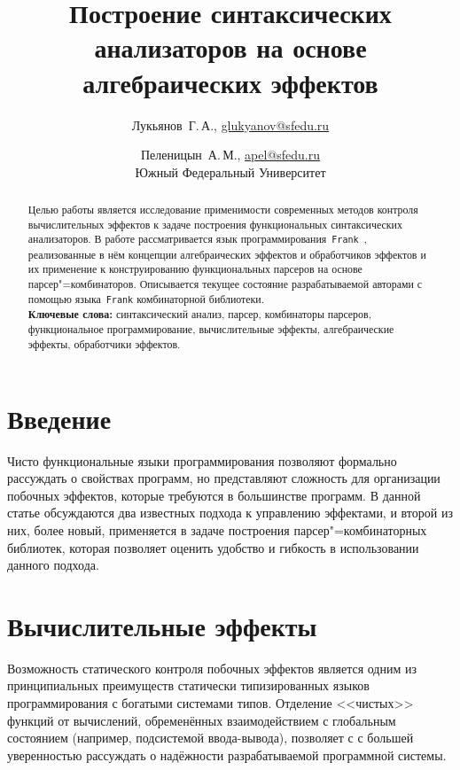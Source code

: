 \documentclass [a4paper] {article}
\title %
  {Построение синтаксических анализаторов
   на основе алгебраических эффектов}
\author %
{%
  Лукьянов~Г.\,А., \url {glukyanov@sfedu.ru} \and %
  Пеленицын~А.\,М., \url {apel@sfedu.ru} \\
  Южный Федеральный Университет
}%
\date {}    %
\begin{document}

\maketitle

\begin {abstract}
  Целью работы является исследование применимости современных методов
  контроля вычислительных эффектов к задаче построения функциональных синтаксических анализаторов. В работе рассматривается язык
  программирования~\texttt{Frank}~\cite{Frank}, реализованные в нём концепции
  алгебраических эффектов и обработчиков эффектов и их применение к конструированию функциональных парсеров на основе парсер"=комбинаторов. Описывается текущее состояние
  разрабатываемой авторами с помощью языка~\texttt{Frank} комбинаторной библиотеки.
  \\ \textbf {Ключевые слова:} синтаксический анализ, парсер,
  комбинаторы парсеров, функциональное программирование, вычислительные эффекты,
  алгебраические эффекты, обработчики эффектов.
\end {abstract}

\section*{Введение}

Чисто функциональные языки программирования позволяют формально рассуждать о свойствах программ, но представляют сложность для организации побочных эффектов, которые требуются в большинстве программ. В данной статье обсуждаются два известных подхода к управлению эффектами, и второй из них, более новый, применяется в задаче построения парсер"=комбинаторных библиотек, которая позволяет оценить удобство и гибкость в использовании данного подхода.

\section{Вычислительные эффекты}

Возможность статического контроля побочных эффектов является одним из
принципиальных преимуществ статически типизированных языков
программирования с богатыми системами типов. Отделение <<чистых>> функций от вычислений, обременённых
взаимодействием с глобальным состоянием (например, подсистемой ввода-вывода), позволяет с с большей уверенностью рассуждать о надёжности
разрабатываемой программной системы.
\end{document}
